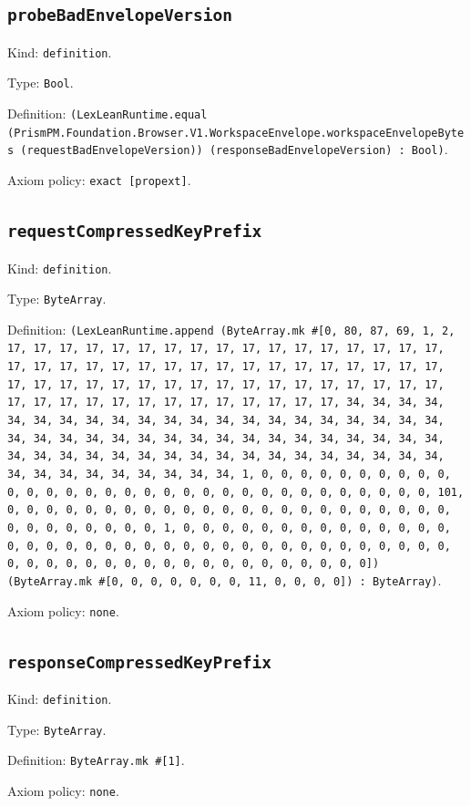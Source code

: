 \documentclass[11pt]{article}
\begin{document}
\subsection*{\texttt{probeBadEnvelopeVersion}}
\noindent Kind: \texttt{definition}.\par
\noindent Type: \texttt{Bool}.\par
\noindent Definition: \texttt{(LexLeanRuntime.equal (PrismPM.Foundation.Browser.V1.WorkspaceEnvelope.workspaceEnvelopeBytes (requestBadEnvelopeVersion)) (responseBadEnvelopeVersion) : Bool)}.\par
\noindent Axiom policy: \texttt{exact [propext]}.\par
\subsection*{\texttt{requestCompressedKeyPrefix}}
\noindent Kind: \texttt{definition}.\par
\noindent Type: \texttt{ByteArray}.\par
\noindent Definition: \texttt{(LexLeanRuntime.append (ByteArray.mk \#[0, 80, 87, 69, 1, 2, 17, 17, 17, 17, 17, 17, 17, 17, 17, 17, 17, 17, 17, 17, 17, 17, 17, 17, 17, 17, 17, 17, 17, 17, 17, 17, 17, 17, 17, 17, 17, 17, 17, 17, 17, 17, 17, 17, 17, 17, 17, 17, 17, 17, 17, 17, 17, 17, 17, 17, 17, 17, 17, 17, 17, 17, 17, 17, 17, 17, 17, 17, 17, 17, 34, 34, 34, 34, 34, 34, 34, 34, 34, 34, 34, 34, 34, 34, 34, 34, 34, 34, 34, 34, 34, 34, 34, 34, 34, 34, 34, 34, 34, 34, 34, 34, 34, 34, 34, 34, 34, 34, 34, 34, 34, 34, 34, 34, 34, 34, 34, 34, 34, 34, 34, 34, 34, 34, 34, 34, 34, 34, 34, 34, 34, 34, 34, 34, 1, 0, 0, 0, 0, 0, 0, 0, 0, 0, 0, 0, 0, 0, 0, 0, 0, 0, 0, 0, 0, 0, 0, 0, 0, 0, 0, 0, 0, 0, 0, 0, 0, 101, 0, 0, 0, 0, 0, 0, 0, 0, 0, 0, 0, 0, 0, 0, 0, 0, 0, 0, 0, 0, 0, 0, 0, 0, 0, 0, 0, 0, 0, 0, 0, 1, 0, 0, 0, 0, 0, 0, 0, 0, 0, 0, 0, 0, 0, 0, 0, 0, 0, 0, 0, 0, 0, 0, 0, 0, 0, 0, 0, 0, 0, 0, 0, 0, 0, 0, 0, 0, 0, 0, 0, 0, 0, 0, 0, 0, 0, 0, 0, 0, 0, 0, 0, 0, 0, 0, 0, 0]) (ByteArray.mk \#[0, 0, 0, 0, 0, 0, 0, 11, 0, 0, 0, 0]) : ByteArray)}.\par
\noindent Axiom policy: \texttt{none}.\par
\subsection*{\texttt{responseCompressedKeyPrefix}}
\noindent Kind: \texttt{definition}.\par
\noindent Type: \texttt{ByteArray}.\par
\noindent Definition: \texttt{ByteArray.mk \#[1]}.\par
\noindent Axiom policy: \texttt{none}.\par
\end{document}
